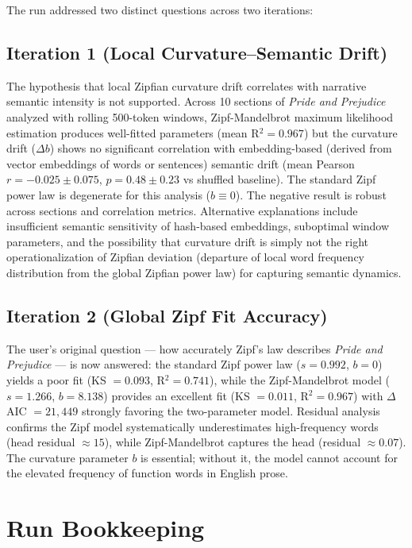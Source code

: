 \documentclass[11pt,letterpaper]{article}
\begin{document}
The run addressed two distinct questions across two iterations:

\subsection{Iteration 1 (Local Curvature--Semantic Drift)}

The hypothesis that local Zipfian curvature drift correlates with narrative semantic intensity is not supported. Across 10 sections of \textit{Pride and Prejudice} analyzed with rolling 500-token windows, Zipf-Mandelbrot maximum likelihood estimation produces well-fitted parameters (mean R$^2 = 0.967$) but the curvature drift ($\Delta b$) shows no significant correlation with embedding-based (derived from vector embeddings of words or sentences) semantic drift (mean Pearson $r = -0.025 \pm 0.075$, $p = 0.48 \pm 0.23$ vs shuffled baseline). The standard Zipf power law is degenerate for this analysis ($b \equiv 0$). The negative result is robust across sections and correlation metrics. Alternative explanations include insufficient semantic sensitivity of hash-based embeddings, suboptimal window parameters, and the possibility that curvature drift is simply not the right operationalization of Zipfian deviation (departure of local word frequency distribution from the global Zipfian power law) for capturing semantic dynamics.

\subsection{Iteration 2 (Global Zipf Fit Accuracy)}

The user's original question --- how accurately Zipf's law describes \textit{Pride and Prejudice} --- is now answered: the standard Zipf power law ($s = 0.992$, $b = 0$) yields a poor fit (KS $= 0.093$, R$^2 = 0.741$), while the Zipf-Mandelbrot model ($s = 1.266$, $b = 8.138$) provides an excellent fit (KS $= 0.011$, R$^2 = 0.967$) with $\Delta$AIC $= 21,449$ strongly favoring the two-parameter model. Residual analysis confirms the Zipf model systematically underestimates high-frequency words (head residual $\approx 15$), while Zipf-Mandelbrot captures the head (residual $\approx 0.07$). The curvature parameter $b$ is essential; without it, the model cannot account for the elevated frequency of function words in English prose.

\section{Run Bookkeeping}
\end{document}
